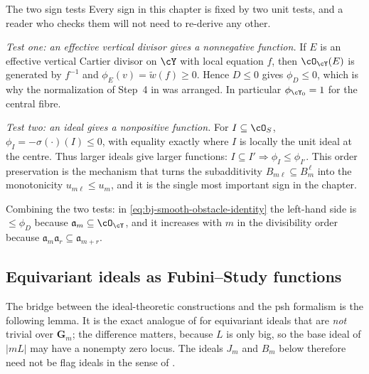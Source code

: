 \begin{warning}{The two sign tests}
\label{warn:ch40-signs}
Every sign in this chapter is fixed by two unit tests, and a reader who
checks them will not need to re-derive any other.

\emph{Test one: an effective vertical divisor gives a nonnegative function.}
If $E$ is an effective vertical Cartier divisor on $\cY$ with local
equation $f$, then $\cO_{\cY}(E)$ is generated by $f^{-1}$ and
$\phi_E(v)=\tilde w(f)\ge0$.  Hence $D\le0$ gives $\phi_D\le0$, which
is why the normalization of Step~4 in
 was arranged.  In particular
$\phi_{\cY_0}=1$ for the central fibre.

\emph{Test two: an ideal gives a nonpositive function.}  For
$I\subseteq\cO_S$, $\phi_I=-\sigma(\cdot)(I)\le0$, with equality exactly
where $I$ is locally the unit ideal at the centre.  Thus larger ideals give
larger functions:
$I\subseteq I'\Rightarrow\phi_I\le\phi_{I'}$.  This order preservation is the
mechanism that turns the subadditivity $B_{m\ell}\subseteq B_m^{\,\ell}$
into the monotonicity $u_{m\ell}\le u_m$, and it is the single most
important sign in the chapter.

Combining the two tests: in \eqref{eq:bj-smooth-obstacle-identity} the
left-hand side is $\le\phi_D$ because
$\mathfrak a_m\subseteq\cO_{\cY}$, and it increases with $m$ in the
divisibility order because $\mathfrak a_m\mathfrak a_r
\subseteq\mathfrak a_{m+r}$.
\end{warning}

\subsection{Equivariant ideals as Fubini--Study functions}
\label{sec:ch40-equivariant-fs}

The bridge between the ideal-theoretic constructions and the psh formalism
is the following lemma.  It is the exact analogue of
 for equivariant ideals that are \emph{not}
trivial over $\mathbf G_m$; the difference matters, because $L$ is only
big, so the base ideal of $|mL|$ may have a nonempty zero locus.
The ideals $J_m$ and $B_m$ below therefore need not be flag ideals in the sense of
.

